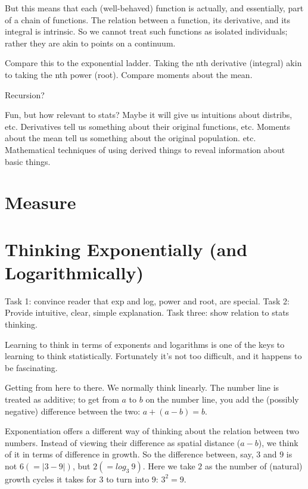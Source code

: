 \begin{remark}
  But this means that each (well-behaved) function is actually, and
  essentially, part of a chain of functions.  The relation between a
  function, its derivative, and its integral is intrinsic.  So we
  cannot treat such functions as isolated individuals; rather they are
  akin to points on a continuum.

  Compare this to the exponential ladder.  Taking the nth derivative
  (integral) akin to taking the nth power (root).  Compare moments
  about the mean.

  Recursion?

  Fun, but how relevant to stats?  Maybe it will give us intuitions
  about distribs, etc.  Derivatives tell us something about their
  original functions, etc.  Moments about the mean tell us something
  about the original population. etc.  Mathematical techniques of
  using derived things to reveal information about basic things.

\end{remark}

\chapter{Measure}


\chapter{Thinking Exponentially (and Logarithmically)}

\begin{remark}
  Task 1: convince reader that exp and log, power and root, are
  special.  Task 2: Provide intuitive, clear, simple explanation.
  Task three: show relation to stats thinking.
\end{remark}

Learning to think in terms of exponents and logarithms is one of the
keys to learning to think statistically.  Fortunately it's not too
difficult, and it happens to be fascinating.

Getting from here to there.  We normally think linearly.  The number
line is treated as additive; to get from $a$ to $b$ on the number
line, you add the (possibly negative) difference between the two: $a +
(a-b) = b$.

Exponentiation offers a different way of thinking about the relation
between two numbers.  Instead of viewing their difference as spatial
distance ($a-b$), we think of it in terms of difference in growth.  So
the difference between, say, $3$ and $9$ is not $6 (= |3-9|)$, but $2
(= log_3\ 9)$.  Here we take $2$ as the number of (natural) growth
cycles it takes for $3$ to turn into $9$: $3^2 = 9$.

